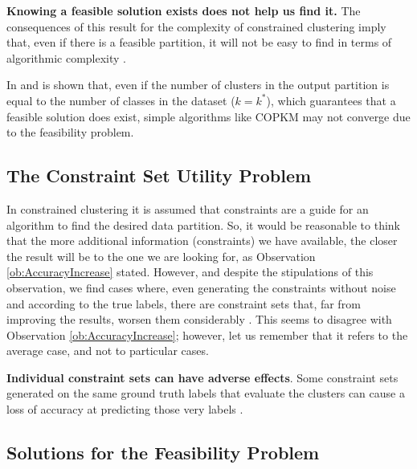\begin{observation}
	
	\textbf{Knowing a feasible solution exists does not help us find it.} The consequences of this result for the complexity of constrained clustering imply that, even if there is a feasible partition, it will not be easy to find in terms of algorithmic complexity \cite{davidson2007survey}.
	\label{ob:FeasibleSolution}
	
\end{observation}

In \cite{wagstaff2002intelligent} and \cite{davidson2007hierarchical} is shown that, even if the number of clusters in the output partition is equal to the number of classes in the dataset ($k = k^*$), which guarantees that a feasible solution does exist, simple algorithms like \acf{COPKM} \cite{wagstaff2001constrained} may not converge due to the feasibility problem.

\subsection{The Constraint Set Utility Problem} \label{sec:UtilityProblem}

In constrained clustering it is assumed that constraints are a guide for an algorithm to find the desired data partition. So, it would be reasonable to think that the more additional information (constraints) we have available, the closer the result will be to the one we are looking for, as Observation \ref{ob:AccuracyIncrease} stated. However, and despite the stipulations of this observation, we find cases where, even generating the constraints without noise and according to the true labels, there are constraint sets that, far from improving the results, worsen them considerably \cite{davidson2006proceedings}. This seems to disagree with Observation \ref{ob:AccuracyIncrease}; however, let us remember that it refers to the average case, and not to particular cases.

\begin{observation}
	
	\textbf{Individual constraint sets can have adverse effects}. Some constraint sets generated on the same ground truth labels that evaluate the clusters can cause a loss of accuracy at predicting those very labels \cite{davidson2007survey}.
	
\end{observation}

\subsection{Solutions for the Feasibility Problem} \label{sec:FeasibilityProblemSolutions}

